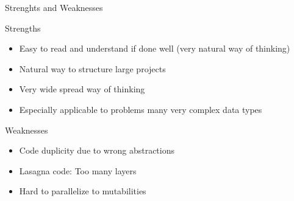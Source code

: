 \begin{frame}{Strenghts and Weaknesses}
	
\begin{block}{Strengths}
	\begin{itemize}
		\item Easy to read and understand if done well (very natural way of thinking)
		\item Natural way to structure large projects
		\item Very wide spread way of thinking
		\item Especially applicable to problems many very complex data types
	\end{itemize}
\end{block}
\begin{block}{Weaknesses}
\begin{itemize}
	\item Code duplicity due to wrong abstractions
	\item Lasagna code: Too many layers 
	\item Hard to parallelize to mutabilities
\end{itemize}
\end{block}
\end{frame}